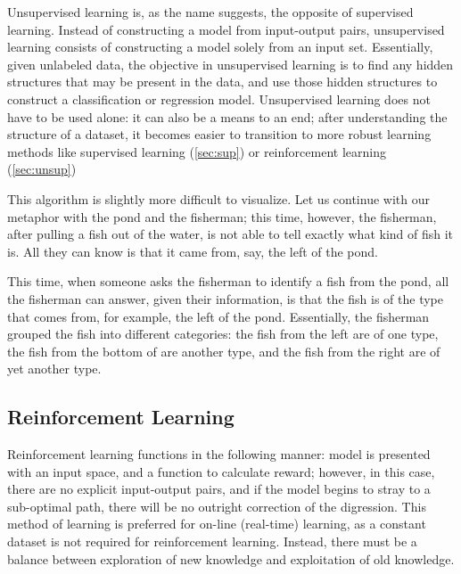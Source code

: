 \documentclass[a4paper]{comjnl}
\numberwithin{equation}{subsection}
\begin{document}
            Unsupervised learning is, as the name suggests, the opposite of supervised learning.
            Instead of constructing a model from input-output pairs, unsupervised learning consists
            of constructing a model solely from an input set. Essentially, given unlabeled data, the
            objective in unsupervised learning is to find any hidden structures that may be present
            in the data, and use those hidden structures to construct a classification or regression
            model. Unsupervised learning does not have to be used alone: it can also be a means to
            an end; after understanding the structure of a dataset, it becomes easier to transition
            to more robust learning methods like supervised learning (\ref{sec:sup}) or
            reinforcement learning (\ref{sec:unsup})

            This algorithm is slightly more difficult to visualize. Let us continue with our
            metaphor with the pond and the fisherman; this time, however, the fisherman, after
            pulling a fish out of the water, is not able to tell exactly what kind of fish it is.
            All they can know is that it came from, say, the left of the pond.

            This time, when someone asks the fisherman to identify a fish from the pond, all the
            fisherman can answer, given their information, is that the fish is of the type that
            comes from, for example, the left of the pond. Essentially, the fisherman grouped the
            fish into different categories: the fish from the left are of one type, the fish from
            the bottom of are another type, and the fish from the right are of yet another type.

        \subsection{Reinforcement Learning}\label{sec:rein}

            Reinforcement learning functions in the following manner: model is presented with an
            input space, and a function to calculate reward; however, in this case, there are no
            explicit input-output pairs, and if the model begins to stray to a sub-optimal path,
            there will be no outright correction of the digression. This method of learning is
            preferred for on-line (real-time) learning, as a constant dataset is not required for
            reinforcement learning. Instead, there must be a balance between exploration of new
            knowledge and exploitation of old knowledge.
\end{document}
